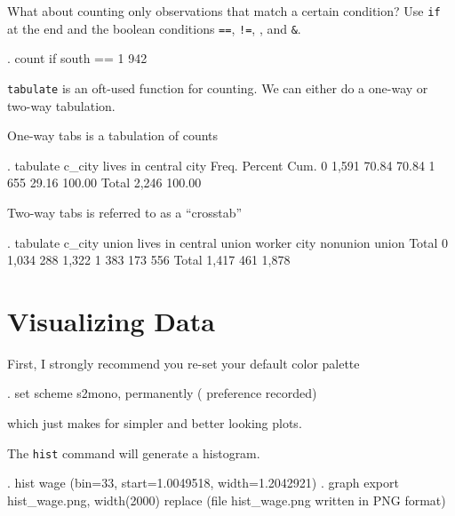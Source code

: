 \documentclass[]{article}
\begin{document}
What about counting only observations that match a certain condition?
Use \texttt{if} at the end and the boolean conditions \texttt{==},
\texttt{!=}, \texttt{\textbar{}}, and \texttt{\&}.

\begin{stlog}
. count if south == 1
  942
{\smallskip}
\end{stlog}

\texttt{tabulate} is an oft-used function for counting. We can either do
a one-way or two-way tabulation.

One-way tabs is a tabulation of counts

\begin{stlog}
. tabulate c_city
{\smallskip}
   lives in {\VBAR}
    central {\VBAR}
       city {\VBAR}      Freq.     Percent        Cum.
          0 {\VBAR}      1,591       70.84       70.84
          1 {\VBAR}        655       29.16      100.00
      Total {\VBAR}      2,246      100.00
{\smallskip}
\end{stlog}

Two-way tabs is referred to as a ``crosstab''

\begin{stlog}
. tabulate c_city union
{\smallskip}
  lives in {\VBAR}
   central {\VBAR}     union worker
      city {\VBAR}  nonunion      union {\VBAR}     Total
         0 {\VBAR}     1,034        288 {\VBAR}     1,322 
         1 {\VBAR}       383        173 {\VBAR}       556 
     Total {\VBAR}     1,417        461 {\VBAR}     1,878 
{\smallskip}
{\smallskip}
\end{stlog}

\section{Visualizing Data}\label{visualizing-data}

First, I strongly recommend you re-set your default color palette

\begin{stlog}
. set scheme s2mono, permanently
({} preference recorded)
{\smallskip}
\end{stlog}

which just makes for simpler and better looking plots.

The \texttt{hist} command will generate a histogram.

\begin{stlog}
. hist wage
(bin=33, start=1.0049518, width=1.2042921)
{\smallskip}
. graph export hist_wage.png, width(2000) replace
(file hist_wage.png written in PNG format)
{\smallskip}
\end{stlog}
\end{document}
